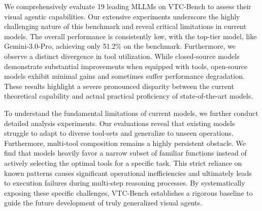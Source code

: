 \documentclass[runningheads]{llncs}
\newcommand{\benchname}{VTC-Bench\xspace}
\begin{document}
We comprehensively evaluate 19 leading MLLMs on \benchname to assess their visual agentic capabilities. Our extensive experiments underscore the highly challenging nature of this benchmark and reveal critical limitations in current models. The overall performance is consistently low, with the top-tier model, like Gemini-3.0-Pro, achieving only 51.2\% on the benchmark. Furthermore, we observe a distinct divergence in tool utilization. While closed-source models demonstrate substantial improvements when equipped with tools, open-source models exhibit minimal gains and sometimes suffer performance degradation. These results highlight a severe pronounced disparity between the current theoretical capability and actual practical proficiency of state-of-the-art models.

To understand the fundamental limitations of current models, we further conduct detailed analysis experiments. Our evaluations reveal that existing models struggle to adapt to diverse tool-sets and generalize to unseen operations. Furthermore, multi-tool composition remains a highly persistent obstacle. We find that models heavily favor a narrow subset of familiar functions instead of actively selecting the optimal tools for a specific task. This strict reliance on known patterns causes significant operational inefficiencies and ultimately leads to execution failures during multi-step reasoning processes. By systematically exposing these specific challenges, \benchname establishes a rigorous baseline to guide the future development of truly generalized visual agents.
\end{document}
